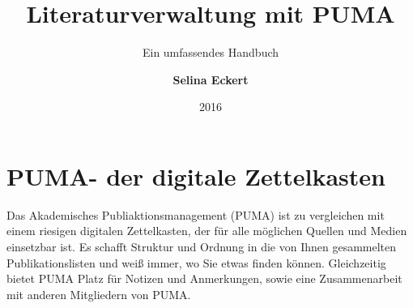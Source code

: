 \documentclass[a4paper,11pt,twoside]{scrbook}
\begin{document}
    \title{\Huge Literaturverwaltung mit PUMA}
    \subtitle{\Large Ein umfassendes Handbuch}
    \author{\textbf{Selina Eckert}}
    \date{2016}

\maketitle
{} 
\tableofcontents 
\newpage
{} 
\section{PUMA- der digitale Zettelkasten}
Das Akademisches Publiaktionsmanagement (PUMA) ist zu vergleichen mit einem riesigen digitalen Zettelkasten, der für alle möglichen Quellen und Medien einsetzbar ist. Es schafft Struktur und Ordnung in die von Ihnen gesammelten Publikationslisten und weiß immer, wo Sie etwas finden können. Gleichzeitig bietet PUMA Platz für Notizen und Anmerkungen, sowie eine Zusammenarbeit mit anderen Mitgliedern von PUMA. 
\end{document}
